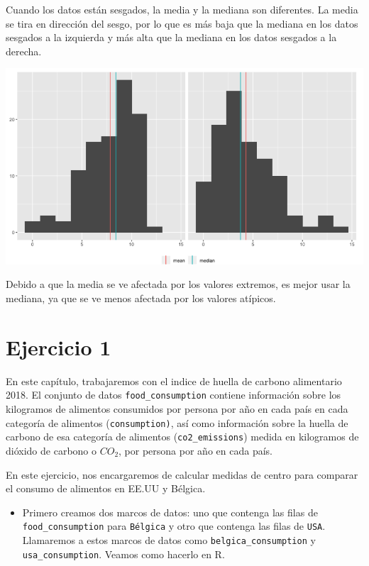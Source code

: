\documentclass[
  letterpaper,
  DIV=11,
  numbers=noendperiod]{scrreprt}
\providecommand{\tightlist}{%
  \setlength{\itemsep}{0pt}\setlength{\parskip}{0pt}}\usepackage{longtable,booktabs,array}
\begin{document}
Cuando los datos están sesgados, la media y la mediana son diferentes.
La media se tira en dirección del sesgo, por lo que es más baja que la
mediana en los datos sesgados a la izquierda y más alta que la mediana
en los datos sesgados a la derecha.

\includegraphics{fig7.png}

Debido a que la media se ve afectada por los valores extremos, es mejor
usar la mediana, ya que se ve menos afectada por los valores atípicos.

\hypertarget{ejercicio-1}{%
\section{Ejercicio 1}\label{ejercicio-1}}

En este capítulo, trabajaremos con el indice de huella de carbono
alimentario 2018. El conjunto de datos \texttt{food\_consumption}
contiene información sobre los kilogramos de alimentos consumidos por
persona por año en cada país en cada categoría de alimentos
(\texttt{consumption)}, así como información sobre la huella de carbono
de esa categoría de alimentos (\texttt{co2\_emissions}) medida en
kilogramos de dióxido de carbono o \(CO_2\), por persona por año en cada
país.

En este ejercicio, nos encargaremos de calcular medidas de centro para
comparar el consumo de alimentos en EE.UU y Bélgica.

\begin{itemize}
\tightlist
\item
  Primero creamos dos marcos de datos: uno que contenga las filas de
  \texttt{food\_consumption} para \texttt{Bélgica} y otro que contenga
  las filas de \texttt{USA}. Llamaremos a estos marcos de datos como
  \texttt{belgica\_consumption} y \texttt{usa\_consumption}. Veamos como
  hacerlo en R.
\end{itemize}
\end{document}

